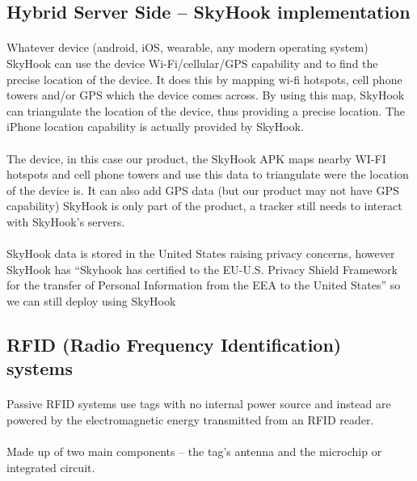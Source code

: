 \documentclass[12pt,a4paper]{article}
\begin{document}
\begin{appendices}
    \subsection{Hybrid Server Side – SkyHook implementation}
      \paragraph{}
        Whatever device (android, iOS, wearable, any modern operating system) SkyHook can use the device Wi-Fi/cellular/GPS capability and to find the precise location of the device. It does this by mapping wi-fi hotspots, cell phone towers and/or GPS which the device comes across. By using this map, SkyHook can triangulate the location of the device, thus providing a precise location. The iPhone location capability is actually provided by SkyHook.
      \paragraph{}
        The device, in this case our product, the SkyHook APK maps nearby WI-FI hotspots and cell phone towers and use this data to triangulate were the location of the device is. It can also add GPS data (but our product may not have GPS capability) SkyHook is only part of the product, a tracker still needs to interact with SkyHook’s servers.
      \paragraph{}
        SkyHook data is stored in the United States raising privacy concerns, however SkyHook has “Skyhook has certified to the EU-U.S. Privacy Shield Framework for the transfer of Personal Information from the EEA to the United States” so we can still deploy using SkyHook
    
    \subsection{RFID (Radio Frequency Identification) systems}
      \paragraph{}
        Passive RFID systems use tags with no internal power source and instead are powered by the electromagnetic energy transmitted from an RFID reader.
      \paragraph{}
        Made up of two main components – the tag’s antenna and the microchip or integrated circuit.

\end{appendices}
\end{document}
